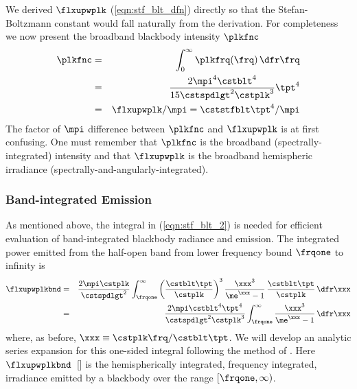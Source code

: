 \documentclass[12pt]{article}
\begin{document}
We derived $\flxupwplk$ (\ref{eqn:stf_blt_dfn}) directly so that
the Stefan-Boltzmann constant would fall naturally from the
derivation. 
For completeness we now present the broadband blackbody intensity
$\plkfnc$
\begin{eqnarray}
\plkfnc & = & \int_{0}^{\infty} \plkfrq(\frq) \,\dfr\frq \nonumber \\
& = & \frac{2 \mpi^{4} \cstblt^{4}}{15 \cstspdlgt^{2} \cstplk^{3}} \tpt^{4} \nonumber \\
& = & \flxupwplk / \mpi = \cststfblt \tpt^{4} / \mpi 
\label{eqn:plk_fnc_dfn}
\end{eqnarray}
The factor of $\mpi$ difference between $\plkfnc$ and $\flxupwplk$ 
is at first confusing.
One must remember that $\plkfnc$ is the broadband
(spectrally-integrated) intensity and that $\flxupwplk$ is the 
broadband hemispheric irradiance
(spectrally-and-angularly-integrated).  

\subsubsection[Band-integrated Emission]{Band-integrated Emission}\label{sxn:msn}
As mentioned above, the integral in (\ref{eqn:stf_blt_2}) is needed
for efficient evaluation of band-integrated blackbody radiance and
emission.
The integrated power emitted from the half-open band from lower
frequency bound $\frqone$ to infinity is
\begin{eqnarray}
\flxupwplkbnd
& = & \frac{2 \mpi \cstplk}{\cstspdlgt^{2}} 
\int_{\frqone}^{\infty} 
\left( \frac{\cstblt \tpt}{\cstplk} \right)^{3}
\frac{\xxx^{3}}{\me^{\xxx} - 1} \, \frac{\cstblt \tpt}{\cstplk} \,\dfr\xxx
\nonumber \\
& = & \frac{2 \mpi \cstblt^{4} \tpt^{4} }{\cstspdlgt^{2} \cstplk^{3}} 
\int_{\frqone}^{\infty} 
\frac{\xxx^{3}}{\me^{\xxx} - 1} \,\dfr\xxx
\label{eqn:plk_ntg_frq}
\end{eqnarray}
where, as before, $\xxx \equiv \cstplk \frq/\cstblt \tpt$.
We will develop an analytic series expansion for this one-sided
integral following the method of \cite{WiW76}.
Here $\flxupwplkbnd$~[\wxmS] is the hemispherically integrated,
frequency integrated, irradiance emitted by a blackbody over the range 
$[\frqone,\infty)$.
\end{document}
